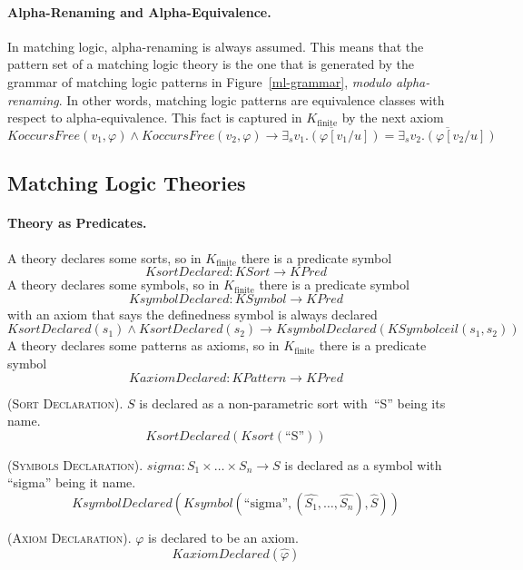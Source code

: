 \documentclass[UTF8,11pt]{article}
\theoremstyle{plain}
\theoremstyle{definition}
\theoremstyle{remark}
\newcommand{\Kfinite}{{K_\text{finite}}}
\newcommand{\KPred}{\mathit{KPred}}
\newcommand{\KSort}{\mathit{KSort}}
\newcommand{\Ksort}{\mathit{Ksort}}
\newcommand{\KSymbol}{\mathit{KSymbol}}
\newcommand{\Ksymbol}{\mathit{Ksymbol}}
\newcommand{\KSymbolceil}{\mathit{KSymbolceil}}
\newcommand{\KPattern}{\mathit{KPattern}}
\newcommand{\KoccursFree}{\mathit{KoccursFree}}
\newcommand{\KsortDeclared}{\mathit{KsortDeclared}}
\newcommand{\KsymbolDeclared}{\mathit{KsymbolDeclared}}
\newcommand{\KaxiomDeclared}{\mathit{KaxiomDeclared}}
\begin{document}
\paragraph{Alpha-Renaming and Alpha-Equivalence.}
In matching logic, alpha-renaming is always assumed.
This means that the pattern set of a matching logic theory is the one that is generated by the grammar of matching logic patterns in Figure~\ref{ml-grammar}, \emph{modulo alpha-renaming}.
In other words, matching logic patterns are equivalence classes with respect to alpha-equivalence.
This fact is captured in $\Kfinite$ by the next axiom
$$
\KoccursFree(v_1, \varphi) \wedge \KoccursFree(v_2, \varphi) \to 
\overline{\exists_s v_1 .(\varphi[v_1 / u])} = 
\overline{\exists_s v_2 .(\varphi[v_2 / u])}
$$

\subsection{Matching Logic Theories}
\label{sec:ML-theories}


\paragraph{Theory as Predicates.}
A theory declares some sorts, so in $\Kfinite$ there is a predicate symbol
$$ \KsortDeclared \colon \KSort \to \KPred$$
A theory declares some symbols, so in $\Kfinite$ there is a predicate symbol
$$ \KsymbolDeclared \colon \KSymbol \to \KPred$$
with an axiom that says the definedness symbol is always declared
$$ \KsortDeclared(s_1) \wedge \KsortDeclared(s_2) \to 
\KsymbolDeclared(\KSymbolceil(s_1, s_2))$$
A theory declares some patterns as axioms, so in $\Kfinite$ there is a 
predicate symbol
$$ \KaxiomDeclared \colon \KPattern \to \KPred$$

(\textsc{Sort Declaration}).
$\mathit{S}$ is declared as a non-parametric sort with~``S'' being its name.
$$
\KsortDeclared(\Ksort(\text{``S''}))
$$

(\textsc{Symbols Declaration}).
$\mathit{sigma} \colon S_1 \times \dots \times S_n \to S$ is declared as a 
symbol with ``sigma'' being it name.
\begin{equation*}
\KsymbolDeclared(\Ksymbol(\text{``sigma''}, 
(\widehat{S_1},\dots,\widehat{S_n}), \widehat{S}))
\end{equation*}

(\textsc{Axiom Declaration}). 
$\varphi$ is declared to be an axiom.
$$\KaxiomDeclared(\widehat{\varphi})$$
\end{document}
